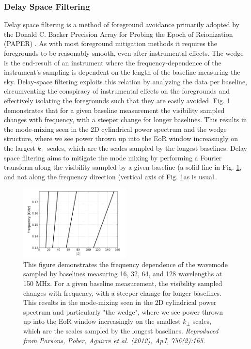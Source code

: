 \subsubsection{Delay Space Filtering}
Delay space filtering is a method of foreground avoidance primarily adopted by the Donald C. Backer Precision Array for Probing the Epoch of Reionization (PAPER) \cite{Parsons2010AJ....139.1468P}. As with most foreground mitigation methods it requires the foregrounds to be reasonably smooth, even after instrumental effects. The wedge is the end-result of an instrument where the frequency-dependence of the instrument's sampling is dependent on the length of the baseline measuring the sky. Delay-space filtering exploits this relation by analyzing the data per baseline, circumventing the conspiracy of instrumental effects on the foregrounds and effectively isolating the foregrounds such that they are easily avoided. Fig. \ref{fig:baselines} demonstrates that for a given baseline measurement the visibility sampled changes with frequency, with a steeper change for longer baselines. This results in the mode-mixing seen in the 2D cylindrical power spectrum and the wedge structure, where we see power thrown up into the EoR window increasingly on the largest $k_\bot$ scales, which are the scales sampled by the longest baselines. Delay space filtering aims to mitigate the mode mixing by performing a Fourier transform along the visibility sampled by a given baseline (a solid line in Fig. \ref{fig:baselines}, and not along the frequency direction (vertical axis of Fig. \ref{fig:baselines}as is usual.

\begin{figure}
\begin{center}
    \includegraphics[width=0.5\textwidth]{Chapman_Jelic/Images/baselines.png}
\end{center}
    \caption{This figure demonstrates the frequency dependence of the wavemode sampled by baselines measuring 16, 32, 64, and 128 wavelengths at 150 MHz. For a given baseline measurement, the visibility sampled changes with frequency, with a steeper change for longer baselines. This results in the mode-mixing seen in the 2D cylindrical power spectrum and particularly "the wedge", where we see power thrown up into the EoR window increasingly on the smallest $k_\bot$ scales, which are the scales sampled by the longest baselines. \textit{Reproduced from Parsons, Pober, Aguirre et al. (2012), ApJ, 756(2):165.}}
    \label{fig:baselines}
\end{figure}

